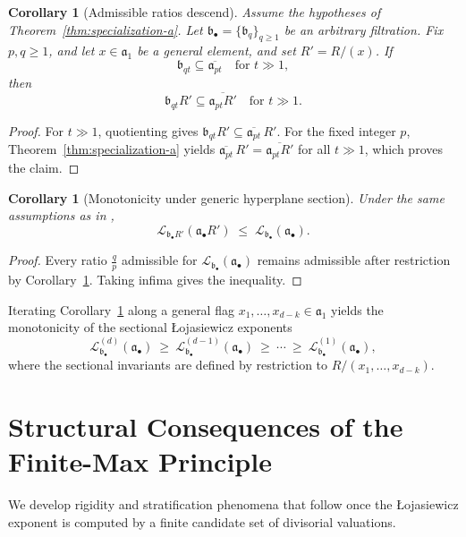 \documentclass[12pt]{amsart}
\renewcommand{\a}{\mathfrak{a}}
\renewcommand{\b}{\mathfrak{b}}
\newcommand{\Loj}{\mathcal{L}} %
\newcommand{\abul}{{\a_\bullet}}
\newcommand{\bbul}{{\b_\bullet}}
\theoremstyle{plain}
\newtheorem{corollary}[theorem]{Corollary}
\theoremstyle{definition}
\numberwithin{equation}{section}
\begin{document}
\begin{corollary}[Admissible ratios descend]
\label{cor:admissible-descend}
Assume the hypotheses of Theorem~\ref{thm:specialization-a}.
Let $\bbul=\{\b_q\}_{q \ge 1}$ be an arbitrary filtration.
Fix $p,q\ge1$, and let $x\in\a_1$ be a general element, and set $R'=R/(x)$.
If
\[
\b_{qt}\subseteq \overline{\a_{pt}}
\quad \text{for } t\gg1,
\]
then
\[
\b_{qt}R' \subseteq \overline{\a_{pt}R'}
\quad \text{for } t\gg1.
\]
\end{corollary}

\begin{proof}
For $t\gg1$, quotienting gives
$\b_{qt}R'\subseteq \overline{\a_{pt}}\,R'$.
For the fixed integer $p$, Theorem~\ref{thm:specialization-a} yields
$\overline{\a_{pt}}\,R'=\overline{\a_{pt}R'}$ for all $t\gg1$,
which proves the claim.
\end{proof}

\begin{corollary}[Monotonicity under generic hyperplane section]
\label{cor:L-monotonicity}
Under the same assumptions as in ,
\[
\Loj_{\bbul R'}(\abul R') \;\le\; \Loj_{\bbul}(\abul).
\]
\end{corollary}

\begin{proof}
Every ratio $\frac{q}{p}$ admissible for $\Loj_{\bbul}(\abul)$ remains
admissible after restriction by
Corollary~\ref{cor:admissible-descend}. Taking infima gives the inequality.
\end{proof}

Iterating Corollary~\ref{cor:L-monotonicity} along a general flag
$x_1,\dots,x_{d-k}\in \a_1$ yields the monotonicity of the sectional
\L{}ojasiewicz exponents
\[
\Loj^{(d)}_{\bbul}(\abul)\ \ge\ \Loj^{(d-1)}_{\bbul}(\abul)\ \ge\ \cdots\ \ge\
\Loj^{(1)}_{\bbul}(\abul),
\]
where the sectional invariants are defined by restriction to
$R/(x_1,\dots,x_{d-k})$.


\part{Structural Consequences of the Finite-Max Principle} \label{part:structuralFinite-max}

We develop rigidity and stratification phenomena that follow once
the \L{}ojasiewicz exponent is computed by a finite candidate set of divisorial
valuations.
\end{document}
